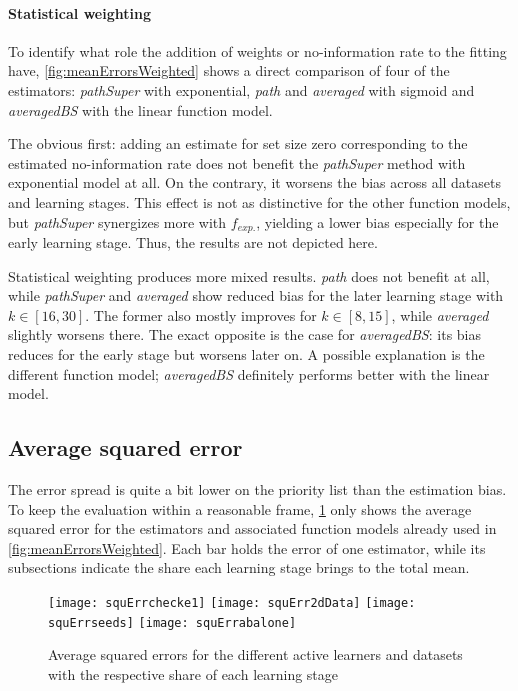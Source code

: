 \paragraph{Statistical weighting}
To identify what role the addition of weights or no-information rate to the fitting have, \ref{fig:meanErrorsWeighted} shows a direct comparison of four of the estimators: \textit{pathSuper} with exponential, \textit{path} and \textit{averaged} with sigmoid and \textit{averagedBS} with the linear function model.

The obvious first: adding an estimate for set size zero corresponding to the estimated no-information rate does not benefit the \textit{pathSuper} method with exponential model at all. On the contrary, it worsens the bias across all datasets and learning stages. This effect is not as distinctive for the other function models, but \textit{pathSuper} synergizes more with $f_{exp.}$, yielding a lower bias especially for the early learning stage. Thus, the results are not depicted here.

Statistical weighting produces more mixed results. \textit{path} does not benefit at all, while \textit{pathSuper} and \textit{averaged} show reduced bias for the later learning stage with $k \in [16,30]$. The former also mostly improves for $k \in [8,15]$, while \textit{averaged} slightly worsens there. The exact opposite is the case for \textit{averagedBS}: its bias reduces for the early stage but worsens later on. A possible explanation is the different function model; \textit{averagedBS} definitely performs better with the linear model.

\subsection{Average squared error}

The error spread is quite a bit lower on the priority list than the estimation bias. To keep the evaluation within a reasonable frame, \ref{fig:squaredErrors} only shows the average squared error for the estimators and associated function models already used in \ref{fig:meanErrorsWeighted}. Each bar holds the error of one estimator, while its subsections indicate the share each learning stage brings to the total mean.

\begin{figure}[h]
	\centering
	\texttt{[image: squErrchecke1]}
	\texttt{[image: squErr2dData]}
	\texttt{[image: squErrseeds]}
	\texttt{[image: squErrabalone]}
	\caption{Average squared errors for the different active learners and datasets with the respective share of each learning stage}
	\label{fig:squaredErrors}
\end{figure}

